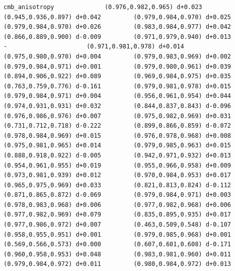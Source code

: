 \documentclass[11pt, letterpaper, openany]{book}
\begin{document}
\begin{empiricalbox}
\begin{lstlisting}[style=terminal]
cmb_anisotropy              (0.976,0.982,0.965) d+0.023         (0.945,0.936,0.897) d+0.042         (0.979,0.984,0.970) d+0.025         (0.979,0.984,0.970) d+0.026         (0.983,0.984,0.977) d+0.042         (0.866,0.889,0.900) d-0.009         (0.971,0.979,0.940) d+0.013                      -                      (0.971,0.981,0.978) d+0.014         (0.975,0.980,0.970) d+0.004         (0.979,0.983,0.969) d+0.002         (0.979,0.984,0.971) d+0.001         (0.979,0.980,0.961) d+0.039         (0.894,0.906,0.922) d+0.089         (0.969,0.984,0.975) d+0.035         (0.763,0.759,0.776) d-0.161         (0.979,0.981,0.978) d+0.015         (0.979,0.984,0.971) d+0.004         (0.956,0.961,0.954) d+0.044         (0.974,0.931,0.931) d+0.032         (0.844,0.837,0.843) d-0.096         (0.976,0.986,0.976) d+0.007         (0.975,0.982,0.969) d+0.031         (0.731,0.712,0.718) d-0.222         (0.899,0.866,0.859) d-0.072         (0.978,0.984,0.969) d+0.015         (0.976,0.978,0.968) d+0.008         (0.975,0.981,0.965) d+0.014         (0.979,0.985,0.963) d+0.015         (0.888,0.918,0.922) d-0.005         (0.942,0.971,0.932) d+0.013         (0.954,0.961,0.955) d+0.019         (0.955,0.966,0.958) d+0.009         (0.973,0.981,0.939) d+0.012         (0.970,0.984,0.953) d+0.017         (0.965,0.975,0.969) d+0.033         (0.821,0.813,0.824) d-0.112         (0.871,0.865,0.872) d-0.069         (0.979,0.984,0.971) d+0.003         (0.978,0.983,0.968) d+0.006         (0.977,0.982,0.968) d+0.006         (0.977,0.982,0.969) d+0.079         (0.835,0.895,0.935) d+0.017         (0.977,0.986,0.972) d+0.007         (0.463,0.509,0.548) d-0.107         (0.958,0.955,0.951) d+0.001         (0.979,0.985,0.968) d+0.001         (0.569,0.566,0.573) d+0.000         (0.607,0.601,0.608) d-0.171         (0.960,0.958,0.953) d+0.048         (0.983,0.981,0.960) d+0.011         (0.979,0.984,0.972) d+0.011         (0.980,0.984,0.972) d+0.013     

\end{lstlisting}
\end{empiricalbox}
\end{document}
